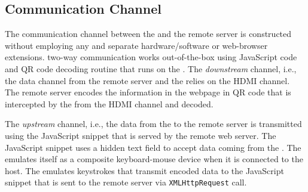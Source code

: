 \iffalse
\subsection{Initialization} 
\label{sec:systemDesign:init}

There are two steps of initialization process: 

\begin{mylist}
  \item\textbf{IO initialization.} The \device initializes the mouse by instructing the host system to move the mouse pointer to the top right corner (moving to the first right and then up for an arbitrarily large value). As the \device has access to the frames that are displayed on the screen, it can verify if the mouse pointer is at the top-right corner of the screen or not. Then it instructs the host OS to bring it to the center of the screen.
  
  \item\textbf{Network initialization.} The \device connects to the remote server using \webusb or \webbt, effectively using the host as an untrusted transport. The \device and the server establishes a secure channel with the public certificates that are distributed before-hand.
\end{mylist}
\fi

\subsection{Communication Channel}
\label{sec:systemDesign:communicationChannel}

The communication channel between the \device and the remote server is constructed without employing any and separate hardware/software or web-browser extensions. \name two-way communication works out-of-the-box using JavaScript code and QR code decoding routine that runs on the \device. The \emph{downstream} channel, i.e., the data channel from the remote server and the \device relies on the HDMI channel. The remote server encodes the information in the webpage in QR code that is intercepted by the \device from the HDMI channel and decoded.

The \emph{upstream} channel, i.e., the data from the \device to the remote server is transmitted using the \name JavaScript snippet that is served by the remote web server. The \name JavaScript snippet uses a hidden text field to accept data coming from the \device. The \device emulates itself as a composite keyboard-mouse device when it is connected to the host. The \device emulates keystrokes that transmit encoded data to the \name JavaScript snippet that is sent to the remote server via \texttt{XMLHttpRequest} call.

